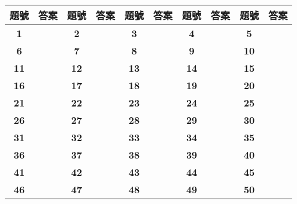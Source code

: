 \documentclass[12pt,a4paper]{report}
\begin{document}
\begin{CJK}{UTF8}{bkai}
\begin{table}[t]
  \center
  \begin{tabular}{|c|c|c|c|c|c|c|c|c|c|}
  \hline
  題號 & 答案 & 題號 & 答案 & 題號 & 答案 & 題號 & 答案 & 題號 & 答案\\
  \hline\hline
  \textbf{1}  & & \textbf{2}  & & \textbf{3}  & & \textbf{4}  & & \textbf{5}  & \\
  \hline
  \textbf{6}  & & \textbf{7}  & & \textbf{8}  & & \textbf{9}  & & \textbf{10} & \\
  \hline
  \textbf{11} & & \textbf{12} & & \textbf{13} & & \textbf{14} & & \textbf{15} & \\
  \hline
  \textbf{16} & & \textbf{17} & & \textbf{18} & & \textbf{19} & & \textbf{20} & \\
  \hline
  \textbf{21} & & \textbf{22} & & \textbf{23} & & \textbf{24} & & \textbf{25} & \\
  \hline
  \textbf{26} & & \textbf{27} & & \textbf{28} & & \textbf{29} & & \textbf{30} & \\
  \hline
  \textbf{31} & & \textbf{32} & & \textbf{33} & & \textbf{34} & & \textbf{35} & \\
  \hline
  \textbf{36} & & \textbf{37} & & \textbf{38} & & \textbf{39} & & \textbf{40} & \\
  \hline
  \textbf{41} & & \textbf{42} & & \textbf{43} & & \textbf{44} & & \textbf{45} & \\
  \hline
  \textbf{46} & & \textbf{47} & & \textbf{48} & & \textbf{49} & & \textbf{50} & \\
  \hline
  \end{tabular}
\end{table}

\end{CJK}
\end{document}
